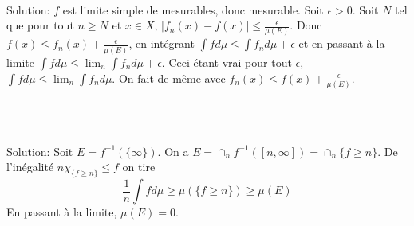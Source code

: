 \documentclass{report}
\begin{document}
\subsection{} \\ \\

Solution: $f$ est limite simple de mesurables, donc mesurable. \newline
Soit $\epsilon>0$. Soit $N$ tel que pour tout $n\geq N$ et $x\in X$, $|f_n(x)-f(x)|\leq \frac{\epsilon}{\mu(E)}$.\newline
Donc $ f(x) \leq f_n(x)+\frac{\epsilon}{\mu(E)}$, en intégrant $\int f d\mu \leq \int f_n d\mu + \epsilon$ et en passant à la limite $\int f d\mu \leq \lim_n \int f_n d\mu + \epsilon $. Ceci étant vrai pour tout $\epsilon$, $\int f d\mu \leq \lim_n \int f_n d\mu$.  \newline
On fait de même avec $ f_n(x) \leq f(x)+\frac{\epsilon}{\mu(E)}$.
\newpage 

\subsection{} \\ \\

Solution: Soit $E=f^{-1}(\{\infty\})$. On a $E= \cap _n f^{-1}([n,\infty]) = \cap_n \{f\geq n\}$.\newline
De l'inégalité $\displaystyle n\chi_{\{f\geq n\}} \leq f$ on tire $$\frac 1n \int f d\mu\geq \mu(\{f\geq n\})\geq \mu(E) $$
En passant à la limite, $\mu(E)=0$.

\subsection{} \\ \\
\end{document}
